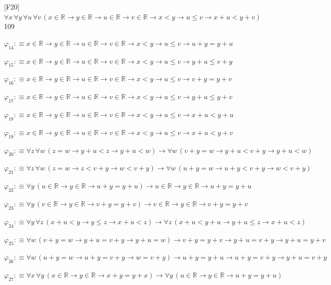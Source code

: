 \begin{fullproof}{[F20]}{$\forall x\,\forall y\,\forall u\,\forall v\,(x \in \mathbb{R} \to y \in \mathbb{R} \to u \in \mathbb{R} \to v \in \mathbb{R} \to x < y \to u \leq v \to x + u < y + v)$}{109}
\begin{abbrevlist}
\item $\varphi_{14} :\equiv x \in \mathbb{R} \to y \in \mathbb{R} \to u \in \mathbb{R} \to v \in \mathbb{R} \to x < y \to u \leq v \to u + y = y + u$
\item $\varphi_{15} :\equiv x \in \mathbb{R} \to y \in \mathbb{R} \to u \in \mathbb{R} \to v \in \mathbb{R} \to x < y \to u \leq v \to y + u \leq v + y$
\item $\varphi_{16} :\equiv x \in \mathbb{R} \to y \in \mathbb{R} \to u \in \mathbb{R} \to v \in \mathbb{R} \to x < y \to u \leq v \to v + y = y + v$
\item $\varphi_{17} :\equiv x \in \mathbb{R} \to y \in \mathbb{R} \to u \in \mathbb{R} \to v \in \mathbb{R} \to x < y \to u \leq v \to y + u \leq y + v$
\item $\varphi_{18} :\equiv x \in \mathbb{R} \to y \in \mathbb{R} \to u \in \mathbb{R} \to v \in \mathbb{R} \to x < y \to u \leq v \to x + u < y + u$
\item $\varphi_{19} :\equiv x \in \mathbb{R} \to y \in \mathbb{R} \to u \in \mathbb{R} \to v \in \mathbb{R} \to x < y \to u \leq v \to x + u < y + v$
\item $\varphi_{20} :\equiv \forall z\,\forall w\,(z = w \to y + u < z \to y + u < w) \to \forall w\,(v + y = w \to y + u < v + y \to y + u < w)$
\item $\varphi_{21} :\equiv \forall z\,\forall w\,(z = w \to z < v + y \to w < v + y) \to \forall w\,(u + y = w \to u + y < v + y \to w < v + y)$
\item $\varphi_{22} :\equiv \forall y\,(u \in \mathbb{R} \to y \in \mathbb{R} \to u + y = y + u) \to u \in \mathbb{R} \to y \in \mathbb{R} \to u + y = y + u$
\item $\varphi_{23} :\equiv \forall y\,(v \in \mathbb{R} \to y \in \mathbb{R} \to v + y = y + v) \to v \in \mathbb{R} \to y \in \mathbb{R} \to v + y = y + v$
\item $\varphi_{24} :\equiv \forall y\,\forall z\,(x + u < y \to y \leq z \to x + u < z) \to \forall z\,(x + u < y + u \to y + u \leq z \to x + u < z)$
\item $\varphi_{25} :\equiv \forall w\,(v + y = w \to y + u = v + y \to y + u = w) \to v + y = y + v \to y + u = v + y \to y + u = y + v$
\item $\varphi_{26} :\equiv \forall w\,(u + y = w \to u + y = v + y \to w = v + y) \to u + y = y + u \to u + y = v + y \to y + u = v + y$
\item $\varphi_{27} :\equiv \forall x\,\forall y\,(x \in \mathbb{R} \to y \in \mathbb{R} \to x + y = y + x) \to \forall y\,(u \in \mathbb{R} \to y \in \mathbb{R} \to u + y = y + u)$

\end{abbrevlist}
\end{fullproof}
